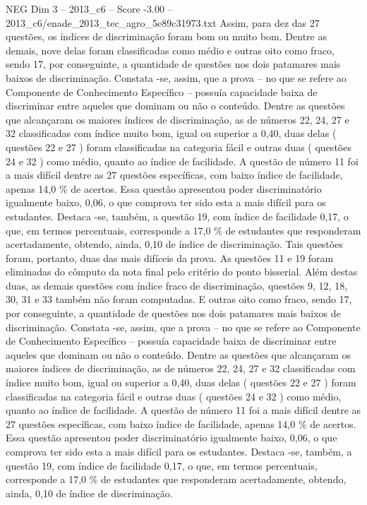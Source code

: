 \begin{textsample}{NEG Dim 3 – 2013\_c6 – Score -3.00 – 2013\_c6/enade\_2013\_tec\_agro\_5e89c31973.txt}
Assim, para dez das 27 questões, os índices de discriminação foram bom ou muito bom.
Dentre as demais, nove delas foram classificadas como médio e outras oito como fraco, sendo 17, por conseguinte, a quantidade de questões nos dois patamares mais baixos de discriminação.
Constata -se, assim, que a prova – no que se refere ao Componente de Conhecimento Específico – possuía capacidade baixa de discriminar entre aqueles que dominam ou não o conteúdo.
Dentre as questões que alcançaram os maiores índices de discriminação, as de números 22, 24, 27 e 32 classificadas com índice muito bom, igual ou superior a 0,40, duas delas ( questões 22 e 27 ) foram classificadas na categoria fácil e outras duas ( questões 24 e 32 ) como médio, quanto ao índice de facilidade.
A questão de número 11 foi a mais difícil dentre as 27 questões específicas, com baixo índice de facilidade, apenas 14,0 \% de acertos.
Essa questão apresentou poder discriminatório igualmente baixo, 0,06, o que comprova ter sido esta a mais difícil para os estudantes.
Destaca -se, também, a questão 19, com índice de facilidade 0,17, o que, em termos percentuais, corresponde a 17,0 \% de estudantes que responderam acertadamente, obtendo, ainda, 0,10 de índice de discriminação.
Tais questões foram, portanto, duas das mais difíceis da prova.
As questões 11 e 19 foram eliminadas do cômputo da nota final pelo critério do ponto bisserial.
Além destas duas, as demais questões com índice fraco de discriminação, questões 9, 12, 18, 30, 31 e 33 também não foram computadas.
E outras oito como fraco, sendo 17, por conseguinte, a quantidade de questões nos dois patamares mais baixos de discriminação.
Constata -se, assim, que a prova – no que se refere ao Componente de Conhecimento Específico – possuía capacidade baixa de discriminar entre aqueles que dominam ou não o conteúdo.
Dentre as questões que alcançaram os maiores índices de discriminação, as de números 22, 24, 27 e 32 classificadas com índice muito bom, igual ou superior a 0,40, duas delas ( questões 22 e 27 ) foram classificadas na categoria fácil e outras duas ( questões 24 e 32 ) como médio, quanto ao índice de facilidade.
A questão de número 11 foi a mais difícil dentre as 27 questões específicas, com baixo índice de facilidade, apenas 14,0 \% de acertos.
Essa questão apresentou poder discriminatório igualmente baixo, 0,06, o que comprova ter sido esta a mais difícil para os estudantes.
Destaca -se, também, a questão 19, com índice de facilidade 0,17, o que, em termos percentuais, corresponde a 17,0 \% de estudantes que responderam acertadamente, obtendo, ainda, 0,10 de índice de discriminação.

\end{textsample}

